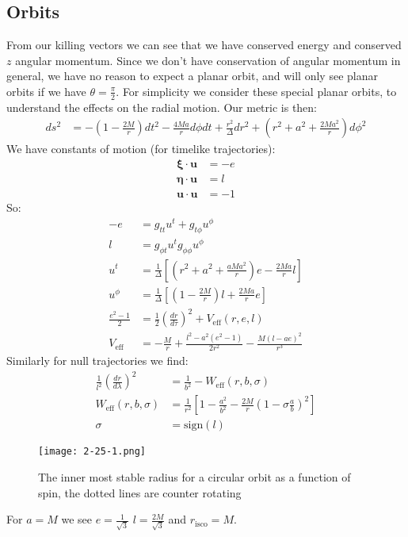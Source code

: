 \subsection{Orbits}
From our killing vectors we can see that we have conserved energy and conserved $z$ angular momentum.
Since we don't have conservation of angular momentum in general, we have no reason to expect a planar orbit, and will only see planar orbits if we have $\theta = \frac{\pi}{2}$.
For simplicity we consider these special planar orbits, to understand the effects on the radial motion.
Our metric is then:
\begin{align*}
	ds^2 &= -\left(1-\frac{2M}{r}\right)dt^2 - \frac{4Ma}{r} d\phi dt + \frac{r^2}{\Delta} dr^2 + \left(r^2 + a^2 + \frac{2Ma^2}{r}\right)d\phi^2
\end{align*}
We have constants of motion (for timelike trajectories):
\begin{align*}
	\bm{\xi}\cdot\bm{u} &= -e \\
	\bm{\eta}\cdot\bm{u} &= l \\
	\bm{u}\cdot\bm{u} &= -1
\end{align*}
So:
\begin{align*}
	-e &= g_{tt} u^t + g_{t\phi} u^\phi \\
	l &= g_{\phi t} u^t g_{\phi\phi} u^\phi \\
	u^t &= \frac{1}{\Delta}\left[\left(r^2 + a^2 + \frac{aMa^2}{r}\right)e - \frac{2Ma}{r} l\right] \\
	u^\phi &= \frac{1}{\Delta}\left[\left(1 - \frac{2M}{r}\right)l + \frac{2Ma}{r}e\right] \\
	\frac{e^2 - 1}{2} &= \frac{1}{2} \left(\frac{dr}{d\tau}\right)^2 + V_\text{eff}(r,e,l) \\
	V_\text{eff} &= -\frac{M}{r} + \frac{l^2 - a^2(e^2 -1)}{2r^2} - \frac{M(l-ae)^2}{r^3}
\end{align*}
Similarly for null trajectories we find:
\begin{align*}
	\frac{1}{l^2} \left(\frac{dr}{d\lambda}\right)^2 &= \frac{1}{b^2} - W_\text{eff}(r,b,\sigma) \\
	W_\text{eff}(r,b,\sigma) &= \frac{1}{r^2}\left[ 1- \frac{a^2}{b^2} - \frac{2M}{r}\left(1- \sigma \frac{a}{b}\right)^2\right] \\
	\sigma &= \text{sign}(l)
\end{align*}
\begin{figure*}[h]
	\centering
	\texttt{[image: 2-25-1.png]}
	\caption*{The inner most stable radius for a circular orbit as a function of spin, the dotted lines are counter rotating}
\end{figure*}
For $a=M$ we see $e= \frac{1}{\sqrt{3}}$ $l = \frac{2M}{\sqrt{3}}$ and $r_\text{isco} = M$.

